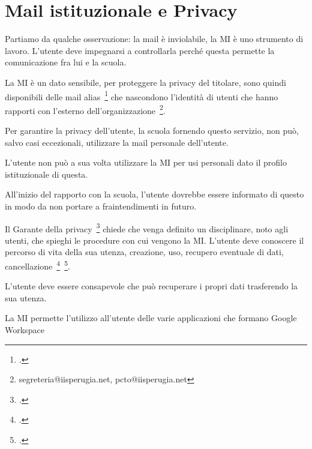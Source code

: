 \section{Mail istituzionale e Privacy}
Partiamo da qualche osservazione: la mail è inviolabile, la 
MI è uno strumento di lavoro. L'utente deve impegnarsi a controllarla perché questa permette la comunicazione fra lui e la scuola. 

La MI è 
un dato sensibile, per proteggere la privacy del titolare,  sono quindi 
disponibili delle mail alias~\footcite{Garante2007} che nascondono l'identità di utenti 
che  hanno rapporti 
con l'esterno dell'organizzazione~\footnote{segreteria@iisperugia.net, pcto@iisperugia.net}. 



Per garantire la privacy dell'utente, la scuola fornendo questo servizio, non può, salvo casi eccezionali, utilizzare 
la mail personale dell'utente.

L'utente non può a sua volta utilizzare la MI per  usi  
personali dato il profilo istituzionale di questa. 

 All'inizio del rapporto con la scuola, l'utente dovrebbe essere informato di questo 
in modo da non portare a fraintendimenti in futuro.

Il Garante della privacy~\footcite{Garante2007} chiede che 
venga definito un disciplinare, noto agli utenti, che spieghi le procedure con cui vengono la MI. 
L'utente deve conoscere il percorso di vita della sua utenza, creazione, uso, 
recupero eventuale di dati, 
cancellazione~\footcite{Garante2007}~\footcite{Garante2019}. 

L'utente deve 
essere consapevole che 
può recuperare i propri dati trasferendo  la sua utenza. 

La MI permette l'utilizzo all'utente delle varie applicazioni che formano \textenglish{Google Workspace}
